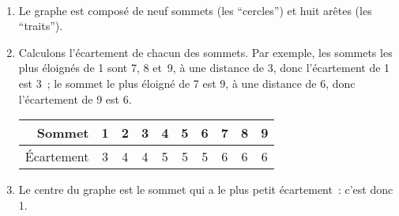 \documentclass[12pt]{article}
\begin{document}
\begin{exercice}~
	\begin{enumerate}
		\item Le graphe est composé de neuf sommets (les \enquote{cercles}) et huit arêtes (les \enquote{traits}).
		\item Calculons l'écartement de chacun des sommets. Par exemple, les sommets les plus éloignés de 1 sont 7, 8 et 9, à une distance de 3, donc l'écartement de 1 est 3 ; le sommet le plus éloigné de 7 est 9, à une distance de 6, donc l'écartement de 9 est 6.
\begin{center}\begin{tabular}{r*{9}{c}}
\toprule
	Sommet & 1&2&3&4&5&6&7&8&9 \\
\midrule
	Écartement & 3&4&4&5&5&5&6&6&6 \\
\bottomrule
\end{tabular}\end{center}
\item Le centre du graphe est le sommet qui a le plus petit écartement : c'est donc 1.
	\end{enumerate}
\end{exercice}
\end{document}
